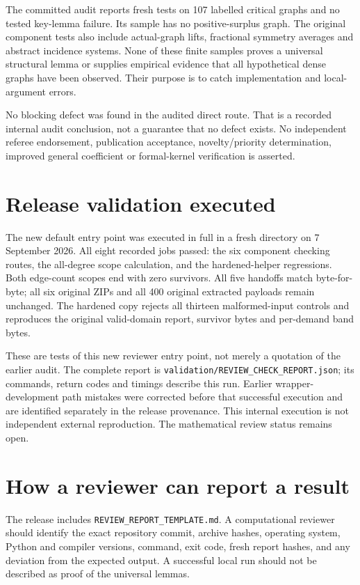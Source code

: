 \documentclass[11pt,a4paper]{article}
\begin{document}
The committed audit reports fresh tests on 107 labelled critical graphs and no tested key-lemma failure. Its sample has no positive-surplus graph. The original component tests also include actual-graph lifts, fractional symmetry averages and abstract incidence systems. None of these finite samples proves a universal structural lemma or supplies empirical evidence that all hypothetical dense graphs have been observed. Their purpose is to catch implementation and local-argument errors.

No blocking defect was found in the audited direct route. That is a recorded internal audit conclusion, not a guarantee that no defect exists. No independent referee endorsement, publication acceptance, novelty/priority determination, improved general coefficient or formal-kernel verification is asserted.

\section{Release validation executed}
The new default entry point was executed in full in a fresh directory on 7 September 2026. All eight recorded jobs passed: the six component checking routes, the all-degree scope calculation, and the hardened-helper regressions. Both edge-count scopes end with zero survivors. All five handoffs match byte-for-byte; all six original ZIPs and all 400 original extracted payloads remain unchanged. The hardened copy rejects all thirteen malformed-input controls and reproduces the original valid-domain report, survivor bytes and per-demand band bytes.

These are tests of this new reviewer entry point, not merely a quotation of the earlier audit. The complete report is \texttt{validation/REVIEW\_CHECK\_REPORT.json}; its commands, return codes and timings describe this run. Earlier wrapper-development path mistakes were corrected before that successful execution and are identified separately in the release provenance. This internal execution is not independent external reproduction. The mathematical review status remains open.

\section{How a reviewer can report a result}
The release includes \texttt{REVIEW\_REPORT\_TEMPLATE.md}. A computational reviewer should identify the exact repository commit, archive hashes, operating system, Python and compiler versions, command, exit code, fresh report hashes, and any deviation from the expected output. A successful local run should not be described as proof of the universal lemmas.
\end{document}
